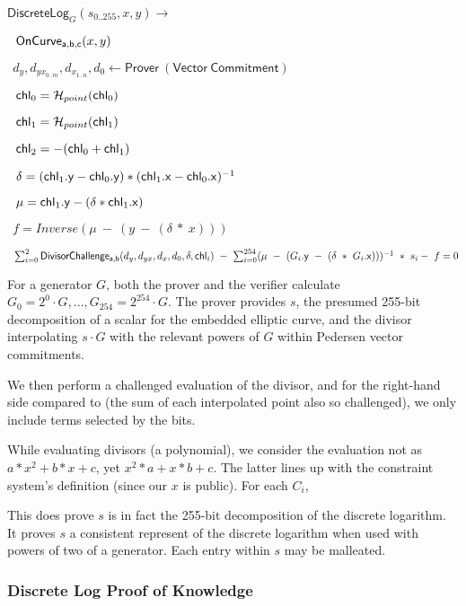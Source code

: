 \documentclass[]{article}
\begin{document}
\newcommand{\circuitin}{\leftarrow \mathsf{Prover ~(Vector ~Commitment)}}

\newcommand{\dlog}{\mathsf{DiscreteLog}}

$\dlog_G(s_{0..255}, x, y) \rightarrow$

$~~\mathsf{OnCurve_{a,b,c}}(x, y)$

$~~d_y, d_{yx_{0..m}}, d_{x_{1..n}}, d_0 \circuitin$

$~~\mathsf{chl}_0 = \mathcal{H}_{point}(\mathsf{chl}_0)$

$~~\mathsf{chl}_1 = \mathcal{H}_{point}(\mathsf{chl}_1)$

$~~\mathsf{chl}_2 = -(\mathsf{chl}_0 + \mathsf{chl}_1)$

$~~\delta = (\mathsf{chl}_1\mathsf{.y} - \mathsf{chl}_0\mathsf{.y}) * (\mathsf{chl}_1\mathsf{.x} - \mathsf{chl}_0\mathsf{.x})^{-1}$

$~~\mu = \mathsf{chl}_1\mathsf{.y} - (\delta * \mathsf{chl}_1\mathsf{.x})$

$~~f = Inverse(\mu ~-~ (y ~-~ (\delta ~*~ x)))$

$~~\sum^2_{i=0} \mathsf{DivisorChallenge_{a,b}}(d_y, d_{yx}, d_x, d_0, \delta, \mathsf{chl}_i) ~-~ \sum^{254}_{i=0} (\mu ~-~ (G_i\mathsf{.y} ~-~ (\delta ~*~ G_i\mathsf{.x})))^{-1} ~*~ s_i - ~f= 0$

For a generator $G$, both the prover and the verifier calculate $G_0 = 2^0 \cdot G, ...,G_{254} = 2^{254} \cdot G$. The prover provides $s$, the presumed 255-bit decomposition of a scalar for the embedded elliptic curve, and the divisor interpolating $s \cdot G$ with the relevant powers of $G$ within Pedersen vector commitments.

We then perform a challenged evaluation of the divisor, and for the right-hand side compared to (the sum of each interpolated point also so challenged), we only include terms selected by the bits.

While evaluating divisors (a polynomial), we consider the evaluation not as $a * x^2 + b * x + c$, yet $x^2 * a + x * b + c$. The latter lines up with the constraint system's definition (since our $x$ is public).
For each $C_i$,

This does prove $s$ is in fact the 255-bit decomposition of the discrete logarithm. It proves $s$ a consistent represent of the discrete logarithm when used with powers of two of a generator. Each entry within $s$ may be malleated.

\subsubsection{Discrete Log Proof of Knowledge}
\end{document}
